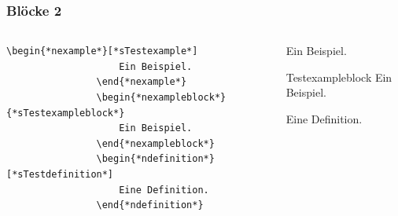 \documentclass[german,notoc,draft]{tudbeamer}%
\begin{document}
\begin{frame}[fragile]
	\frametitle{Blöcke 2}

	\begin{columns}[T,onlytextwidth]
		\begin{column}[T]{.475\textwidth}
			\begin{lstlisting}[gobble=8,style=latex]
				\begin{*nexample*}[*sTestexample*]
					Ein Beispiel.
				\end{*nexample*}
				\begin{*nexampleblock*}{*sTestexampleblock*}
					Ein Beispiel.
				\end{*nexampleblock*}
				\begin{*ndefinition*}[*sTestdefinition*]
					Eine Definition.
				\end{*ndefinition*}
			\end{lstlisting} 
		\end{column}
		\begin{column}[T]{.475\textwidth}
			\begin{example}[Testexample]
				Ein Beispiel.
			\end{example}
			\begin{exampleblock}{Testexampleblock}
				Ein Beispiel.
			\end{exampleblock}
			\begin{definition}[Testdefinition]
				Eine Definition.
			\end{definition}
		\end{column}
	\end{columns}
\end{frame}
\end{document}
